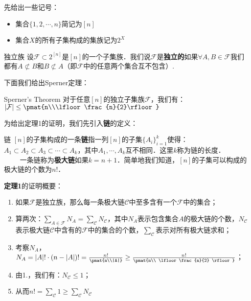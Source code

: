 
先给出一些记号：
\begin{itemize}
\item 集合$\{1,2,\cdots,n\}$简记为$[n]$
\item 集合$X$的所有子集构成的集族记为$2^{X}$
\end{itemize}

\begin{definition}{独立族}
设$\mathcal{F}\subset 2^{[n]}$是$[n]$的一个子集族．我们说$\mathcal{F}$是\textbf{独立的}如果$\forall A,B\in \mathcal{F}$我们都有$A\not\subset B$和$B\not\subset A$（即$\mathcal{F}$中的任意两个集合互不包含）.
\end{definition}

下面我们给出Sperner定理：
\begin{theorem}{Sperner's Theorem}
对于任意$[n]$的独立子集族$\mathcal{F}$，我们有：$|\mathcal{F}|\leq \pmat{n\\\lfloor \frac{n}{2}\rfloor}$

\end{theorem}
为给出定理1的证明，我们先引入\textbf{链}的定义：
\begin{definition}{链}
$[n]$的子集构成的一条\textbf{链}指一列$[n]$的子集$\{A_i\}_{i=1}^{k}$使得：\\
$A_1\subset A_2\subset A_3\subset \cdots \subset A_k$，其中$A_1,\cdots,A_k$互不相同．这里$k$称为链的长度．\\
$\qquad$
一条链称为\textbf{极大链}如果$k=n+1$．简单地我们知道，$[n]$的子集可以构成的极大链的个数为$n!$．
\end{definition}

\textbf{定理1}的证明概要：\\
\begin{enumerate}
\item 如果$\mathcal{F}$是独立族，那么每一条极大链$\mathcal{C}$中至多含有一个$\mathcal{F}$中的集合；
\item 算两次：$\sum\limits_{A\in \mathcal{F}}N_A=\sum\limits_{\mathcal{C}}N_{\mathcal{C}}$，其中$N_A$表示包含集合$A$的极大链的个数，$N_{\mathcal{C}}$表示极大链$\mathcal{C}$中含有的$\mathcal{F}$中的集合的个数，$\sum\limits_{\mathcal{C}}$表示对所有极大链求和；
\item 考察$N_A$，$N_A=|A|!\cdot (n-|A|)!=\frac{n!}{\pmat{n\\|A|}}\geq\frac{n!}{\pmat{n\\ \lfloor\frac{n}{2} \rfloor}}$；
\item 由1.，我们有：$N_{\mathcal{C}}\leq 1$；
\item 从而$n!=\sum\limits_{\mathcal{C}}1\geq \sum\limits_{\mathcal{C}}N_{\mathcal{C}}$
\end{enumerate}

